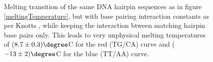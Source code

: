 \begin{figure}[htb]
       \begin{center}
               \scalebox{0.9}{
                        \nonstopmode
                        
                        \errorstopmode
                        \rule[-0.5cm]{0cm}{0cm}}
                \caption{Melting transition of the same DNA hairpin sequences as in figure \ref{meltingTemperature}, but with base pairing interaction constants as per Knotts \etal \cite{knotts2007coarse}, while keeping the interaction btween matching hairpin base pairs only. This leads to very unphysical melting temperatures of ($8.7 \pm 0.3)\degree$C for the red (TG/CA) curve and ($-13 \pm 2)\degree$C for the blue (TT/AA) curve.}
                \label{meltingTemperatureKnotts}
        \end{center}
\end{figure}

